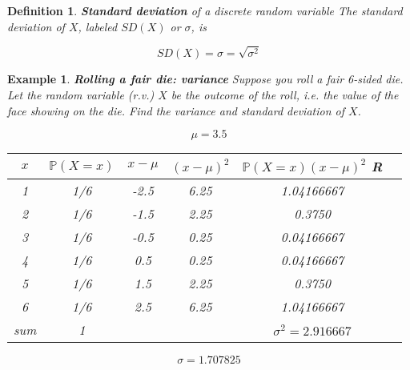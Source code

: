 \documentclass[12pt]{amsart}
\newtheorem{definition}[theorem]{Definition}
\newtheorem{example}[theorem]{Example}
\begin{document}
{\begin{definition}{\textbf{Standard deviation} of a discrete random variable} \newline
The standard deviation of $X$, labeled $SD(X)$ or $\sigma$, is 

\color{blue}
$$ SD(X) = \sigma = \sqrt{\sigma^2}$$
\color{black}

\end{definition}




\begin{example}  \textbf{Rolling a fair die: variance} \newline
Suppose you roll a fair 6-sided die. Let the random variable (r.v.) $X$ be the outcome of the roll, i.e. the value of the face showing on the die.  \newline
Find the variance and standard deviation of $X$.



\vspace{1cm}

\color{blue}

$$\mu = 3.5$$

\vspace{1cm}
\begin{tabular}{| c | c | c | c | c | c |}
  \hline                       
  $x$ & $\mathbb{P}(X=x)$ &  $x - \mu$ & $(x - \mu)^2$ & $\mathbb{P}(X=x)(x - \mu)^2$  R\\
   \hline     
  1 & 1/6  & -2.5 &  6.25 & 1.04166667\\
  2 & 1/6    & -1.5 & 2.25 &  0.3750\\
  3 & 1/6    & -0.5 &  0.25 & 0.04166667\\
  4 & 1/6    & 0.5 & 0.25 &  0.04166667\\
  5 & 1/6   & 1.5   &  2.25 & 0.3750\\
  6 & 1/6    &2.5 & 6.25 & 1.04166667\\
   \hline   
   sum & 1 &    &  & $\sigma^2 = 2.916667$\\
  \hline  
\end{tabular}
\vspace{1cm}
$$\sigma =1.707825 $$



\end{example}}
\end{document}
